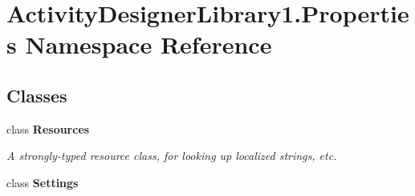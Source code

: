 \hypertarget{namespace_activity_designer_library1_1_1_properties}{}\section{Activity\+Designer\+Library1.\+Properties Namespace Reference}
\label{namespace_activity_designer_library1_1_1_properties}
\subsection*{Classes}
\begin{DoxyCompactItemize}
\item 
class {\bfseries Resources}
\begin{DoxyCompactList}\small\item\em A strongly-\/typed resource class, for looking up localized strings, etc. \end{DoxyCompactList}\item 
class {\bfseries Settings}
\end{DoxyCompactItemize}
